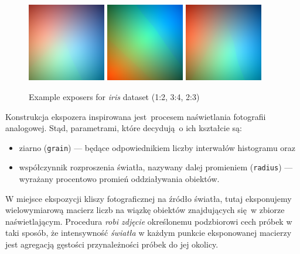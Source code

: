 \documentclass[]{article}
\begin{document}
\begin{figure}[hbt]
	\centering
	\includegraphics[width=0.305\textwidth]{figures/exponer_iris_1_2}
	\includegraphics[width=0.305\textwidth]{figures/exponer_iris_4_3}
	\includegraphics[width=0.305\textwidth]{figures/exponer_iris_3_2}
  	\caption{Example exposers for \emph{iris} dataset (1:2, 3:4, 2:3)}
  	\label{fig:exp1}
\end{figure}

Konstrukcja ekspozera inspirowana jest procesem naświetlania fotografii analogowej. Stąd, parametrami, które decydują o ich kształcie są:

\begin{itemize}
	\item ziarno (\verb|grain|) --- będące odpowiednikiem liczby interwałów histogramu oraz
	\item współczynnik rozproszenia światła, nazywany dalej promieniem (\verb|radius|) --- wyrażany procentowo promień oddziaływania obiektów. 
\end{itemize}

W miejsce ekspozycji kliszy fotograficznej na źródło światła, tutaj eksponujemy wielowymiarową macierz liczb na wiązkę obiektów znajdujących się w zbiorze naświetlającym. Procedura \emph{robi zdjęcie} określonemu podzbiorowi cech próbek w taki sposób, że intensywność \emph{światła} w każdym punkcie eksponowanej macierzy jest agregacją gęstości przynależności próbek do jej okolicy.
\end{document}
